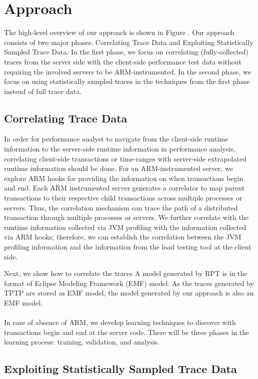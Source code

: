 \section{Approach}
\label{sec:approach}

The high-level overview of our approach is shown in Figure . 
Our approach consists of two major phases: Correlating Trace Data and Exploiting Statistically Sampled Trace Data.
In the first phase, we focus on correlating (fully-collected) traces from the server side with the client-side performance test data without requiring the involved servers to be ARM-instrumented.
In the second phase, we focus on using statistically sampled traces in the techniques from the first phase instead of full trace data.

\subsection{Correlating Trace Data}
\label{sec:correlating}
In order for performance analyst to navigate from the client-side runtime information to the server-side runtime information in performance analysis, correlating client-side transactions or time-ranges with server-side extrapolated runtime information should be done.
For an ARM-instrumented server, we explore ARM hooks for providing the information on when transactions begin and end. Each ARM instrumented server generates a correlator to map parent transactions to their respective child transactions across multiple processes or servers. Thus, the correlation mechanism can trace the path of a distributed transaction through multiple processes or servers. We further correlate with the runtime information collected via JVM profiling with the information collected via ARM hooks; therefore, we can establish the correlation between the JVM profiling information and the information from the load testing tool at the client side.

Next, we show how to correlate the traces 
A model generated by RPT is in the format of Eclipse Modeling Framework (EMF\cite{emf}) model. As the traces generated by TPTP are stored as EMF model, the model generated by our approach is also an EMF model. 
\\
\\
In case of absence of ARM, we develop learning techniques to discover with transactions begin and end at the server code. There will be three phases in the learning process: training, validation, and analysis.

\subsection{Exploiting Statistically Sampled Trace Data}
\label{sec:statistical}

